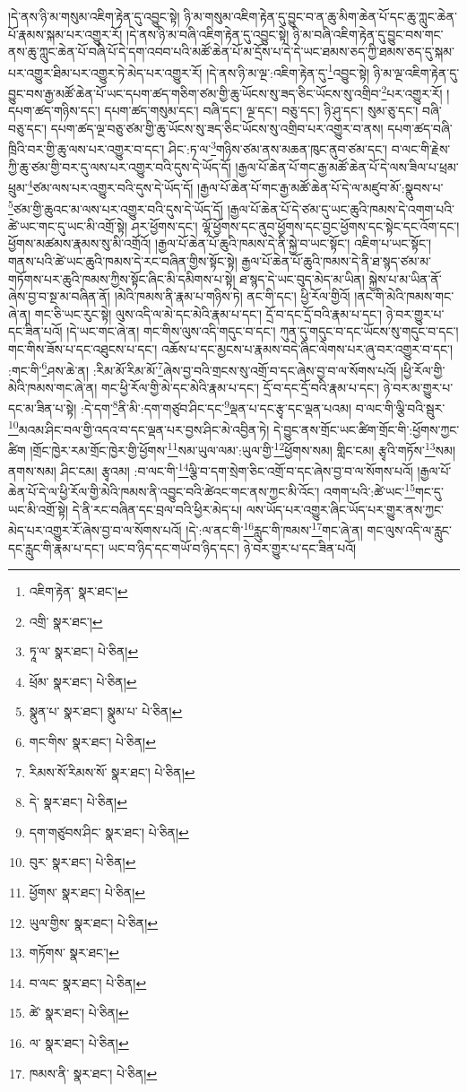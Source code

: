 །དེ་ནས་ཉི་མ་གསུམ་འཇིག་རྟེན་དུ་འབྱུང་སྟེ། ཉི་མ་གསུམ་འཇིག་རྟེན་དུ་བྱུང་བ་ན་ཆུ་མིག་ཆེན་པོ་དང་ཆུ་ཀླུང་ཆེན་པོ་རྣམས་སྐམ་པར་འགྱུར་རོ། །དེ་ནས་ཉི་མ་བཞི་འཇིག་རྟེན་དུ་འབྱུང་སྟེ། ཉི་མ་བཞི་འཇིག་རྟེན་དུ་བྱུང་བས་གང་ནས་ཆུ་ཀླུང་ཆེན་པོ་བཞི་པོ་དེ་དག་འབབ་པའི་མཚོ་ཆེན་པོ་མ་དྲོས་པ་དེ་དེ་ཡང་ཐམས་ཅད་ཀྱི་ཐམས་ཅད་དུ་སྐམ་པར་འགྱུར་ཐིམ་པར་འགྱུར་ཏེ་མེད་པར་འགྱུར་རོ། །དེ་ནས་ཉི་མ་ལྔ་:འཇིག་རྟེན་དུ་\footnote{འཇིག་རྟེན་  སྣར་ཐང་། }འབྱུང་སྟེ། ཉི་མ་ལྔ་འཇིག་རྟེན་དུ་བྱུང་བས་རྒྱ་མཚོ་ཆེན་པོ་ཡང་དཔག་ཚད་གཅིག་ཙམ་གྱི་ཆུ་ཡོངས་སུ་ཟད་ཅིང་ཡོངས་སུ་འགྲིབ་\footnote{འགྲི་  སྣར་ཐང་། }པར་འགྱུར་རོ། །དཔག་ཚད་གཉིས་དང་། དཔག་ཚད་གསུམ་དང་། བཞི་དང་། ལྔ་དང་། བཅུ་དང་། ཉི་ཤུ་དང་། སུམ་ཅུ་དང་། བཞི་བཅུ་དང་། དཔག་ཚད་ལྔ་བཅུ་ཙམ་གྱི་ཆུ་ཡོངས་སུ་ཟད་ཅིང་ཡོངས་སུ་འགྲིབ་པར་འགྱུར་བ་ནས། དཔག་ཚད་བཞི་ཁྲིའི་བར་གྱི་ཆུ་ལས་པར་འགྱུར་བ་དང་། ཤིང་:ཏ་ལ་\footnote{ཏཱ་ལ་  སྣར་ཐང་།  པེ་ཅིན། }གཉིས་ཙམ་ནས་མཆན་ཁུང་ནུབ་ཙམ་དང་། བ་ལང་གི་རྗེས་ཀྱི་ཆུ་ཙམ་གྱི་བར་དུ་ལས་པར་འགྱུར་བའི་དུས་དེ་ཡོད་དོ། །རྒྱལ་པོ་ཆེན་པོ་གང་རྒྱ་མཚོ་ཆེན་པོ་དེ་ལས་ཟིལ་པ་ཕྲམ་ཕྲུམ་\footnote{ཕྲོམ་  སྣར་ཐང་།  པེ་ཅིན། }ཙམ་ལས་པར་འགྱུར་བའི་དུས་དེ་ཡོད་དོ། །རྒྱལ་པོ་ཆེན་པོ་གང་རྒྱ་མཚོ་ཆེན་པོ་དེ་ལ་མཛུབ་མོ་:སྣུབས་པ་\footnote{སྣུན་པ་  སྣར་ཐང་། སྣུམ་པ་  པེ་ཅིན། }ཙམ་གྱི་ཆུའང་མ་ལས་པར་འགྱུར་བའི་དུས་དེ་ཡོད་དོ། །རྒྱལ་པོ་ཆེན་པོ་དེ་ཙམ་དུ་ཡང་ཆུའི་ཁམས་དེ་འགག་པའི་ཚེ་ཡང་གང་དུ་ཡང་མི་འགྲོ་སྟེ། ཤར་ཕྱོགས་དང་། ལྷོ་ཕྱོགས་དང་ནུབ་ཕྱོགས་དང་བྱང་ཕྱོགས་དང་སྟེང་དང་འོག་དང་། ཕྱོགས་མཚམས་རྣམས་སུ་མི་འགྲོའོ། །རྒྱལ་པོ་ཆེན་པོ་ཆུའི་ཁམས་དེ་ནི་སྐྱེ་བ་ཡང་སྟོང་། འཇིག་པ་ཡང་སྟོང་། གནས་པའི་ཚེ་ཡང་ཆུའི་ཁམས་དེ་རང་བཞིན་གྱིས་སྟོང་སྟེ། རྒྱལ་པོ་ཆེན་པོ་ཆུའི་ཁམས་དེ་ནི་ཐ་སྙད་ཙམ་མ་གཏོགས་པར་ཆུའི་ཁམས་ཀྱིས་སྟོང་ཞིང་མི་དམིགས་པ་སྟེ། ཐ་སྙད་དེ་ཡང་བུད་མེད་མ་ཡིན། སྐྱེས་པ་མ་ཡིན་ནོ་ཞེས་བྱ་བ་སྔ་མ་བཞིན་ནོ། །མེའི་ཁམས་ནི་རྣམ་པ་གཉིས་ཏེ། ནང་གི་དང་། ཕྱི་རོལ་གྱིའོ། །ནང་གི་མེའི་ཁམས་གང་ཞེ་ན། གང་ཅི་ཡང་རུང་སྟེ། ལུས་འདི་ལ་མེ་དང་མེའི་རྣམ་པ་དང་། དྲོ་བ་དང་དྲོ་བའི་རྣམ་པ་དང་། ཉེ་བར་གྱུར་པ་དང་ཟིན་པའོ། །དེ་ཡང་གང་ཞེ་ན། གང་གིས་ལུས་འདི་གདུང་བ་དང་། ཀུན་དུ་གདུང་བ་དང་ཡོངས་སུ་གདུང་བ་དང་། གང་གིས་ཟོས་པ་དང་འཐུངས་པ་དང་། འཆོས་པ་དང་མྱངས་པ་རྣམས་བདེ་ཞིང་ལེགས་པར་ཞུ་བར་འགྱུར་བ་དང་། :གང་གི་\footnote{གང་གིས་  སྣར་ཐང་།  པེ་ཅིན། }ཤས་ཆེ་ན། :རིམ་མོ་རིམ་མོ་\footnote{རིམས་སོ་རིམས་སོ་  སྣར་ཐང་།  པེ་ཅིན། }ཞེས་བྱ་བའི་གྲངས་སུ་འགྲོ་བ་དང་ཞེས་བྱ་བ་ལ་སོགས་པའོ། །ཕྱི་རོལ་གྱི་མེའི་ཁམས་གང་ཞེ་ན། གང་ཕྱི་རོལ་གྱི་མེ་དང་མེའི་རྣམ་པ་དང་། དྲོ་བ་དང་དྲོ་བའི་རྣམ་པ་དང་། ཉེ་བར་མ་གྱུར་པ་དང་མ་ཟིན་པ་སྟེ། :དེ་དག་\footnote{དེ་  སྣར་ཐང་།  པེ་ཅིན། }ནི་མི་:དག་གཙུབ་ཤིང་དང་\footnote{དག་གཙུབས་ཤིང་  སྣར་ཐང་།  པེ་ཅིན། }ལྡན་པ་དང་རྩྭ་དང་ལྡན་པའམ། བ་ལང་གི་ལྕི་བའི་སྦུར་\footnote{བུར་  སྣར་ཐང་།  པེ་ཅིན། }མའམ་ཤིང་བལ་གྱི་འདའ་བ་དང་ལྡན་པར་བྱས་ཤིང་མེ་འབྱིན་ཏེ། དེ་བྱུང་ནས་གྲོང་ཡང་ཚིག་གྲོང་གི་:ཕྱོགས་ཀྱང་ཚིག །གྲོང་ཁྱེར་རམ་གྲོང་ཁྱེར་གྱི་ཕྱོགས་\footnote{ཕྱོགས་  སྣར་ཐང་།  པེ་ཅིན། }སམ་ཡུལ་ལམ་:ཡུལ་གྱི་\footnote{ཡུལ་གྱིས་  སྣར་ཐང་།  པེ་ཅིན། }ཕྱོགས་སམ། གླིང་ངམ། རྩྭའི་གཏོས་\footnote{གཏོགས་  སྣར་ཐང་། }སམ། ནགས་སམ། ཤིང་ངམ། རྩྭའམ། :བ་ལང་གི་\footnote{བ་ལང་  སྣར་ཐང་།  པེ་ཅིན། }ལྕི་བ་དག་སྲེག་ཅིང་འགྲོ་བ་དང་ཞེས་བྱ་བ་ལ་སོགས་པའོ། །རྒྱལ་པོ་ཆེན་པོ་དེ་ལ་ཕྱི་རོལ་གྱི་མེའི་ཁམས་ནི་འབྱུང་བའི་ཚེའང་གང་ནས་ཀྱང་མི་འོང་། འགག་པའི་:ཚེ་ཡང་\footnote{ཚེ་  སྣར་ཐང་།  པེ་ཅིན། }གང་དུ་ཡང་མི་འགྲོ་སྟེ། དེ་ནི་རང་བཞིན་དང་བྲལ་བའི་ཕྱིར་མེད་པ། ལས་ཡོད་པར་འགྱུར་ཞིང་ཡོད་པར་གྱུར་ནས་ཀྱང་མེད་པར་འགྱུར་རོ་ཞེས་བྱ་བ་ལ་སོགས་པའོ། །དེ་:ལ་ནང་གི་\footnote{ལ་  སྣར་ཐང་།  པེ་ཅིན། }རླུང་གི་ཁམས་\footnote{ཁམས་ནི་  སྣར་ཐང་།  པེ་ཅིན། }གང་ཞེ་ན། གང་ལུས་འདི་ལ་རླུང་དང་རླུང་གི་རྣམ་པ་དང་། ཡང་བ་ཉིད་དང་གཡོ་བ་ཉིད་དང་། ཉེ་བར་གྱུར་པ་དང་ཟིན་པའོ། 